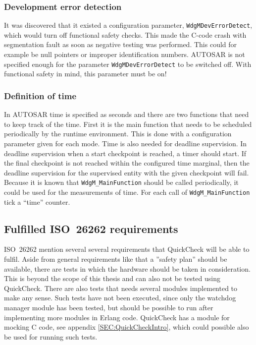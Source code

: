 \subsubsection{Development error detection}
\label{SEC:DEVERRORDETECT}
It was discovered that it existed a configuration parameter,
\lstinline!WdgMDevErrorDetect!, which would turn off functional safety
checks. This made the C-code crash with segmentation fault as soon as
negative testing was performed. This could for example be null pointers or
improper identification numbers. AUTOSAR is not specified enough for
the parameter \lstinline!WdgMDevErrorDetect!  to be switched off. With
functional safety in mind, this parameter must be on!

\subsubsection{Definition of time}
\label{SEC:FUNCTIONAL_SAFETY_TIME}
In AUTOSAR time is specified as seconds and there are two functions that need to
keep track of the time. First it is the main function that needs to be scheduled
periodically by the runtime environment. This is done with a configuration
parameter given for each mode. Time is also needed for deadline supervision. In
deadline supervision when a start checkpoint is reached, a timer should
start. If the final checkpoint is not reached within the configured time
marginal, then the deadline supervision for the supervised entity with the given
checkpoint will fail. Because it is known that \lstinline!WdgM_MainFunction! should
be called periodically, it could be used for the measurements of time. For each
call of \lstinline!WdgM_MainFunction! tick a ``time'' counter.


\subsection{Fulfilled ISO~26262 requirements}
ISO~26262 mention several several requirements that QuickCheck will be able to
fulfil. Aside from general requirements like that a ''safety plan'' should be
available, there are tests in which the hardware should be taken in
consideration. This is beyond the scope of this thesis and can also not be
tested using QuickCheck. There are also tests that needs several modules
implemented to make any sense. Such tests have not been executed, since only the
watchdog manager module has been tested, but should be possible to run after
implementing more modules in Erlang code. QuickCheck has a module for mocking C
code, see appendix \ref{SEC:QuickCheckIntro}, which could possible also be used
for running such tests.

